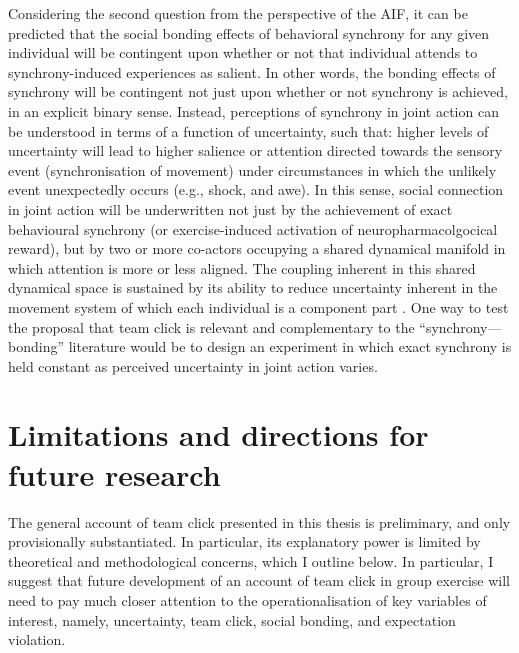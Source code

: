 Considering the second question from the perspective of the AIF,  it can be predicted that the social bonding effects of behavioral synchrony for any given individual will be contingent upon whether or not that individual attends to synchrony-induced experiences as salient.  In other words, the bonding effects of synchrony will be contingent not just upon whether or not synchrony is achieved, in an explicit binary sense.  Instead, perceptions of synchrony in joint action can be understood in terms of a function of uncertainty, such that: higher levels of uncertainty will lead to higher salience or attention directed towards the sensory event (synchronisation of movement) under circumstances in which the unlikely event unexpectedly occurs (e.g., shock, and awe).  In this sense, social connection in joint action will be underwritten not just by the achievement of exact behavioural synchrony (or exercise-induced activation of neuropharmacolgocical reward), but by two or more co-actors occupying a shared dynamical manifold in which attention is more or less aligned. The coupling inherent in this shared dynamical space is sustained by its ability to reduce uncertainty inherent in the movement system of which each individual is a component part \citep{Marsh2009;Riley2011;Fusaroli2014}.  One way to test the proposal that team click is relevant and complementary to the ``synchrony---bonding'' literature would be to design an experiment in which exact synchrony is held constant as perceived uncertainty in joint action varies.



\section{Limitations and directions for future research}
The general account of team click presented in this thesis is preliminary, and only provisionally substantiated. In particular, its explanatory power is limited by theoretical and methodological concerns, which I outline below.  In particular, I suggest that future development of an account of team click in group exercise will need to pay much closer attention to the operationalisation of key variables of interest, namely, uncertainty, team click, social bonding, and expectation violation.

